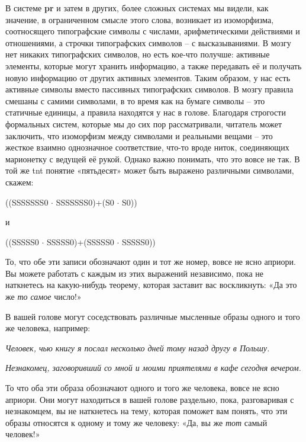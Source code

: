 \documentclass[../main.tex]{subfiles}
\begin{document}
В системе \textbf{pr} и затем в других, более сложных системах мы видели, как значение, в ограниченном смысле этого слова, возникает из изоморфизма, соотносящего типографские символы с числами, арифметическими действиями и отношениями, а строчки типографских символов \--- с высказываниями. В мозгу нет никаких типографских символов, но есть кое-что получше: активные элементы, которые могут хранить информацию, а также передавать её и получать новую информацию от других активных элементов. Таким образом, у нас есть активные символы вместо пассивных типографских символов. В мозгу правила смешаны с самими символами, в то время как на бумаге символы \--- это статичные единицы, а правила находятся у нас в голове. Благодаря строгости формальных систем, которые мы до сих пор рассматривали, читатель может заключить, что изоморфизм между символами и реальными вещами \--- это жесткое взаимно однозначное соответствие, что-то вроде ниток, соединяющих марионетку с ведущей её рукой. Однако важно понимать, что это вовсе не так. В той же \acs{tnt} понятие «пятьдесят» может быть выражено различными символами, скажем:

\begin{center}
    ((SSSSSSS{\large0} $\cdot$ SSSSSSS{\large0})+(S{\large0} $\cdot$ S{\large0}))

    и

    ((SSSSS{\large0} $\cdot$ SSSSS{\large0})+(SSSSS{\large0} $\cdot$ SSSSS{\large0}))
\end{center}

То, что обе эти записи обозначают один и тот же номер, вовсе не ясно априори. Вы можете работать с каждым из этих выражений независимо, пока не наткнетесь на какую-нибудь теорему, которая заставит вас воскликнуть: «Да это же \emph{то самое} число!»

В вашей голове могут соседствовать различные мысленные образы одного и того же человека, например:

\emph{Человек, чью книгу я послал несколько дней тому назад другу в Польшу.}

\emph{Незнакомец, заговоривший со мной и моими приятелями в кафе сегодня вечером.}

То что оба эти образа обозначают одного и того же человека, вовсе не ясно априори. Они могут находиться в вашей голове раздельно, пока, разговаривая с незнакомцем, вы не наткнетесь на тему, которая поможет вам понять, что эти образы относятся к одному и тому же человеку: «Да, вы же \emph{тот} самый человек!»
\end{document}
